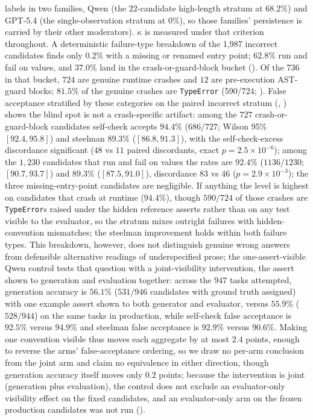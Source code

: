 \documentclass[a4paper,journal]{IAENGtran}
\begin{document}
labels in two families, Qwen (the $22$-candidate high-length stratum at $68.2\%$)
and GPT-5.4 (the single-observation stratum at $0\%$), so those families'
persistence is carried by their other moderators). $\kappa$ is measured under that criterion throughout. A deterministic failure-type
breakdown of the 1,987 incorrect candidates finds only $0.2\%$ with a missing or
renamed entry point; $62.8\%$ run and fail on values, and $37.0\%$ land in the crash-or-guard-block
bucket (). Of the 736 in that
bucket, $724$ are genuine runtime crashes and $12$ are pre-execution AST-guard blocks;
$81.5\%$ of the genuine crashes are \texttt{TypeError} (590/724;
). False acceptance stratified
by these categories on the paired incorrect stratum
(,
) shows the blind spot is not a crash-specific
artifact: among the $727$ crash-or-guard-block candidates self-check accepts $94.4\%$
($686/727$; Wilson 95\% $[92.4,95.8]$) and steelman $89.3\%$ ($[86.8,91.3]$), with the
self-check-excess discordance significant ($48$ vs $11$ paired discordants, exact
$p=2.5\times10^{-6}$); among the $1{,}230$ candidates that run and fail on values the
rates are $92.4\%$ ($1136/1230$; $[90.7,93.7]$) and $89.3\%$ ($[87.5,91.0]$),
discordance $83$ vs $46$ ($p=2.9\times10^{-3}$); the three missing-entry-point
candidates are negligible. If anything the level is highest on candidates that crash at runtime
($94.4\%$), though $590/724$ of those crashes are \texttt{TypeError}s raised under the
hidden reference asserts rather than on any test visible to the evaluator, so the
stratum mixes outright failures with hidden-convention mismatches; the steelman
improvement holds within both failure types. This breakdown, however, does
not distinguish genuine wrong answers from defensible alternative
readings of underspecified prose; the one-assert-visible Qwen control tests that
question with a joint-visibility intervention, the assert shown to generation and
evaluation together: across the $947$ tasks attempted, generation accuracy is $56.1\%$ ($531/946$
candidates with ground truth assigned) with one example
assert shown to both generator and evaluator, versus $55.9\%$ ($528/944$) on the same tasks in
production, while self-check false acceptance is $92.5\%$ versus $94.9\%$ and
steelman false acceptance is $92.9\%$ versus $90.6\%$. Making one convention visible
thus moves each aggregate by at most $2.4$ points, enough to reverse the arms'
false-acceptance ordering, so we draw no per-arm conclusion from the joint arm and
claim no equivalence in either direction, though generation accuracy itself moves
only $0.2$ points; because the intervention is joint (generation plus
evaluation), the control does not exclude an evaluator-only visibility effect on
the fixed candidates, and an evaluator-only arm on the frozen production candidates
was not run
().
\end{document}
